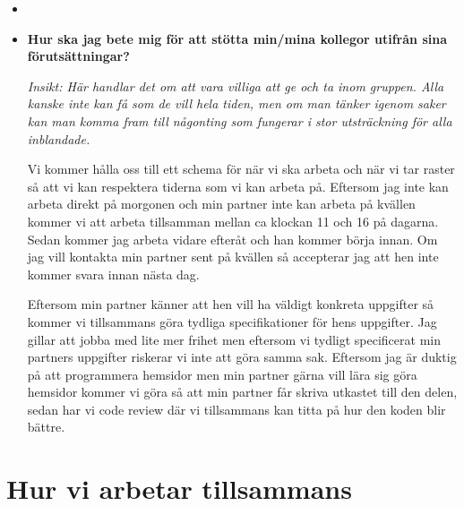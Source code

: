 \documentclass{mall}
\begin{document}
\begin{itemize}
\item \textbf{}

\item \textbf{Hur ska jag bete mig för att stötta min/mina kollegor utifrån sina förutsättningar?}

 \emph{ Insikt: Här handlar det om att vara villiga att ge och ta inom gruppen. Alla kanske inte kan få som de vill
  hela tiden, men om man tänker igenom saker kan man komma fram till någonting som fungerar i stor utsträckning
  för alla inblandade.}

  Vi kommer hålla oss till ett schema för när vi ska arbeta och när vi tar raster så att vi kan respektera
  tiderna som vi kan arbeta på. Eftersom jag inte kan arbeta direkt på morgonen och min partner inte kan
  arbeta på kvällen kommer vi att arbeta tillsamman mellan ca klockan 11 och 16 på dagarna. Sedan kommer
  jag arbeta vidare efteråt och han kommer börja innan. Om jag vill kontakta min partner sent på kvällen
  så accepterar jag att hen inte kommer svara innan nästa dag.

  Eftersom min partner känner att hen vill ha väldigt konkreta uppgifter så kommer vi tillsammans göra tydliga
  specifikationer för hens uppgifter. Jag gillar att jobba med lite mer frihet men eftersom vi tydligt specificerat
  min partners uppgifter riskerar vi inte att göra samma sak. Eftersom jag är duktig på att programmera hemsidor men
  min partner gärna vill lära sig göra hemsidor kommer vi göra så att min partner får skriva utkastet till den delen,
  sedan har vi code review där vi tillsammans kan titta på hur den koden blir bättre.


\end{itemize}

\section{Hur vi arbetar tillsammans}
\end{document}
